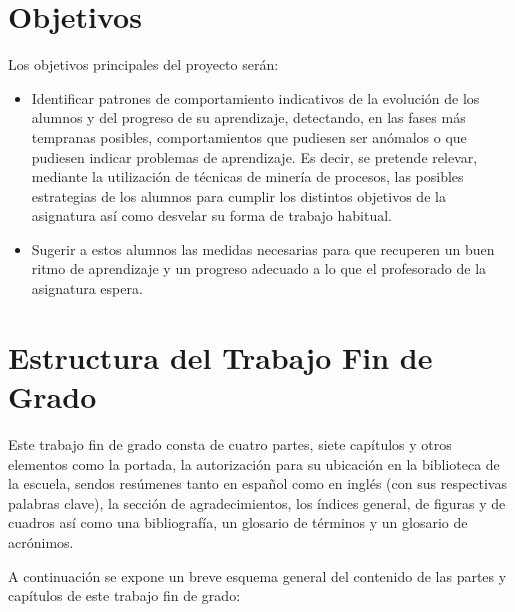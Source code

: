 \section{Objetivos}

Los objetivos principales del proyecto serán:
\begin{itemize}
\item Identificar patrones de comportamiento indicativos de la evolución de los alumnos y del progreso de su aprendizaje, detectando, en las fases más tempranas posibles, comportamientos que pudiesen ser anómalos o que pudiesen indicar problemas de aprendizaje. Es decir, se pretende relevar, mediante la utilización de técnicas de minería de procesos, las posibles estrategias de los alumnos para cumplir los distintos objetivos de la asignatura así como desvelar su forma de trabajo habitual.
\item Sugerir a estos alumnos las medidas necesarias para que recuperen un buen ritmo de aprendizaje y un progreso adecuado a lo que el profesorado de la asignatura espera.
\end{itemize}

\section{Estructura del Trabajo Fin de Grado}

Este trabajo fin de grado consta de cuatro partes, siete capítulos y otros elementos como la portada, la autorización para su ubicación en la biblioteca de la escuela, sendos resúmenes tanto en español como en inglés (con sus respectivas palabras clave), la sección de agradecimientos, los índices general, de figuras y de cuadros así como una bibliografía, un glosario de términos y un glosario de acrónimos.

A continuación se expone un breve esquema general del contenido de las partes y capítulos de este trabajo fin de grado:

